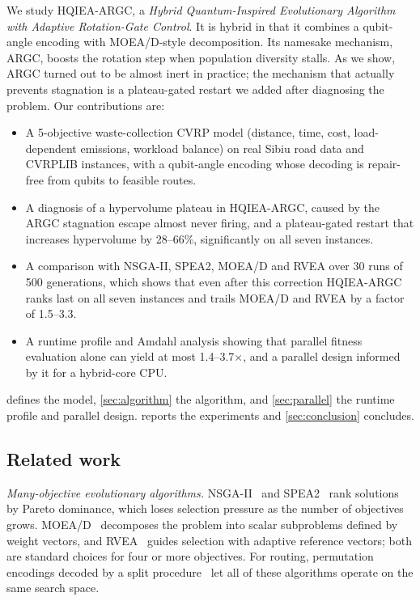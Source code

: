 We study HQIEA-ARGC, a \emph{Hybrid Quantum-Inspired Evolutionary Algorithm with
Adaptive Rotation-Gate Control}. It is hybrid in that it combines a qubit-angle
encoding with MOEA/D-style decomposition. Its namesake mechanism, ARGC, boosts the
rotation step when population diversity stalls. As we show, ARGC turned out to be
almost inert in practice; the mechanism that actually prevents stagnation is a
plateau-gated restart we added after diagnosing the problem. Our contributions are:
\begin{itemize}
\item A 5-objective waste-collection CVRP model (distance, time, cost,
  load-dependent emissions, workload balance) on real Sibiu road data and
  CVRPLIB instances, with a qubit-angle encoding whose decoding is repair-free
  from qubits to feasible routes.
\item A diagnosis of a hypervolume plateau in HQIEA-ARGC, caused by the ARGC
  stagnation escape almost never firing, and a plateau-gated restart that increases hypervolume by 28--66\%,
  significantly on all seven instances.
\item A comparison with NSGA-II, SPEA2, MOEA/D and RVEA over 30 runs of 500
  generations, which shows that even after this correction HQIEA-ARGC ranks last on
  all seven instances and trails MOEA/D and RVEA by a factor of 1.5--3.3.
\item A runtime profile and Amdahl analysis showing that parallel fitness
  evaluation alone can yield at most 1.4--3.7$\times$, and a parallel design
  informed by it for a hybrid-core CPU.
\end{itemize}

 defines the model, \cref{sec:algorithm} the algorithm, and
\cref{sec:parallel} the runtime profile and parallel design.
 reports the experiments and \cref{sec:conclusion}
concludes.

\subsection{Related work}
\emph{Many-objective evolutionary algorithms.} NSGA-II~\cite{deb2002nsga2} and
SPEA2~\cite{zitzler2001spea2} rank solutions by Pareto dominance, which loses
selection pressure as the number of objectives grows. MOEA/D~\cite{zhang2007moead}
decomposes the problem into scalar subproblems defined by weight vectors, and
RVEA~\cite{cheng2016rvea} guides selection with adaptive reference vectors; both
are standard choices for four or more objectives. For routing, permutation
encodings decoded by a split procedure~\cite{prins2004simple} let all of these
algorithms operate on the same search space.

